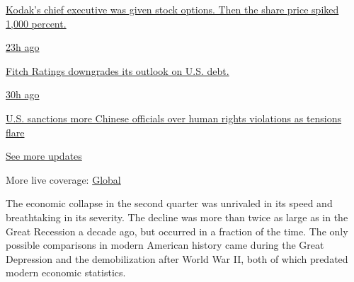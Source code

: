 \href{https://www.nytimes3xbfgragh.onion/live/2020/07/31/business/stock-market-today-coronavirus?action=click\&pgtype=Article\&state=default\&region=MAIN_CONTENT_1\&context=storylines_live_updates\#kodaks-chief-executive-was-given-stock-options-then-the-share-price-spiked-1000-percent}{Kodak's
chief executive was given stock options. Then the share price spiked
1,000 percent.}

\href{https://www.nytimes3xbfgragh.onion/live/2020/07/31/business/stock-market-today-coronavirus?action=click\&pgtype=Article\&state=default\&region=MAIN_CONTENT_1\&context=storylines_live_updates\#fitch-ratings-downgrades-its-outlook-on-us-debt}{23h
ago}

\href{https://www.nytimes3xbfgragh.onion/live/2020/07/31/business/stock-market-today-coronavirus?action=click\&pgtype=Article\&state=default\&region=MAIN_CONTENT_1\&context=storylines_live_updates\#fitch-ratings-downgrades-its-outlook-on-us-debt}{Fitch
Ratings downgrades its outlook on U.S. debt.}

\href{https://www.nytimes3xbfgragh.onion/live/2020/07/31/business/stock-market-today-coronavirus?action=click\&pgtype=Article\&state=default\&region=MAIN_CONTENT_1\&context=storylines_live_updates\#us-sanctions-more-chinese-officials-over-human-rights-violations-as-tensions-flare}{30h
ago}

\href{https://www.nytimes3xbfgragh.onion/live/2020/07/31/business/stock-market-today-coronavirus?action=click\&pgtype=Article\&state=default\&region=MAIN_CONTENT_1\&context=storylines_live_updates\#us-sanctions-more-chinese-officials-over-human-rights-violations-as-tensions-flare}{U.S.
sanctions more Chinese officials over human rights violations as
tensions flare}

\href{https://www.nytimes3xbfgragh.onion/live/2020/07/31/business/stock-market-today-coronavirus?action=click\&pgtype=Article\&state=default\&region=MAIN_CONTENT_1\&context=storylines_live_updates}{See
more updates}

More live coverage:
\href{https://www.nytimes3xbfgragh.onion/2020/08/01/world/coronavirus-covid-19.html?action=click\&pgtype=Article\&state=default\&region=MAIN_CONTENT_1\&context=storylines_live_updates}{Global}

The economic collapse in the second quarter was unrivaled in its speed
and breathtaking in its severity. The decline was more than twice as
large as in the Great Recession a decade ago, but occurred in a fraction
of the time. The only possible comparisons in modern American history
came during the Great Depression and the demobilization after World War
II, both of which predated modern economic statistics.

